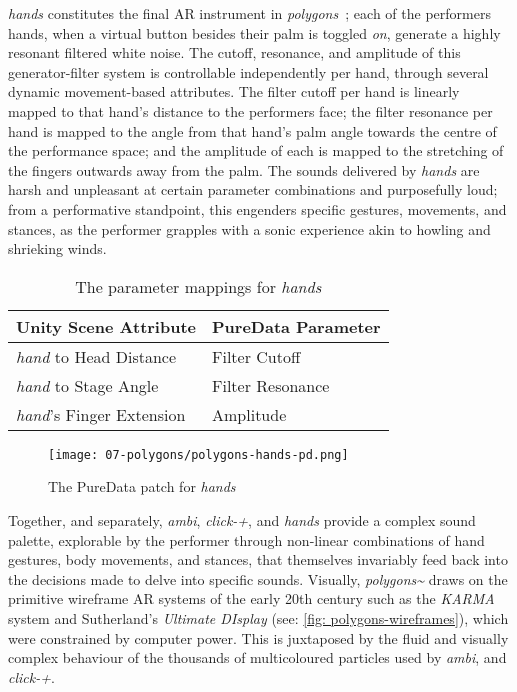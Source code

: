 \textit{hands} constitutes the final AR instrument in \textit{polygons~}; each of the performers hands, when a virtual button besides their palm is toggled \textit{on}, generate a highly resonant filtered white noise. The cutoff, resonance, and amplitude of this generator-filter system is controllable independently per hand, through several dynamic movement-based attributes. The filter cutoff per hand is linearly mapped to that hand's distance to the performers face; the filter resonance per hand is mapped to the angle from that hand's palm angle towards the centre of the performance space; and the amplitude of each is mapped to the stretching of the fingers outwards away from the palm. The sounds delivered by \textit{hands} are harsh and unpleasant at certain parameter combinations and purposefully loud; from a performative standpoint, this engenders specific gestures, movements, and stances, as the performer grapples with a sonic experience akin to howling and shrieking winds.
\begin{table}
    \centering
    \begin{tabular}{ l|l }
        \textbf{Unity Scene Attribute}         & \textbf{PureData Parameter}    \\
        \hline      
        \textit{hand} to Head Distance         & Filter Cutoff                  \\
        \textit{hand} to Stage Angle           & Filter Resonance               \\
        \textit{hand}'s Finger Extension       & Amplitude               
    \end{tabular}
    \caption{The parameter mappings for \textit{hands}}
    \label{fig: polygons-hands-mapping}
\end{table}
\begin{figure}
    \centering
    \texttt{[image: 07-polygons/polygons-hands-pd.png]}
    \caption{The PureData patch for \textit{hands}}
    \label{fig: polygons-hands-pd}
\end{figure}

Together, and separately, \textit{ambi}, \textit{click-+}, and \textit{hands} provide a complex sound palette, explorable by the performer through non-linear combinations of hand gestures, body movements, and stances, that themselves invariably feed back into the decisions made to delve into specific sounds. Visually, \textit{polygons\textasciitilde{}} draws on the primitive wireframe AR systems of the early 20th century such as the \textit{KARMA} system \cite{feiner1993} and Sutherland's \textit{Ultimate DIsplay} \citep{sutherland1968} (see: \autoref{fig: polygons-wireframes}), which were constrained by computer power. This is juxtaposed by the fluid and visually complex behaviour of the thousands of multicoloured particles used by \textit{ambi}, and \textit{click-+}.

